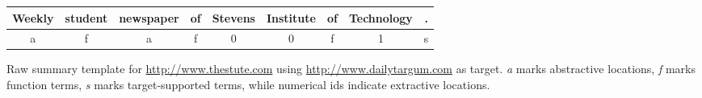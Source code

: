 \begin{tabular}{| c | c | c | c | c | c | c | c | c |}
Weekly & student & newspaper & of & Stevens & Institute & of & Technology & .\\
\hline
a & f & a & f & 0 & 0 & f & 1 & s\\
\end{tabular}
\caption{Raw summary template for \url{http://www.thestute.com} using \url{http://www.dailytargum.com} as target. \emph{a} marks abstractive locations, \emph{f} marks function terms, \emph{s} marks target-supported terms, while numerical ids indicate extractive locations.}
